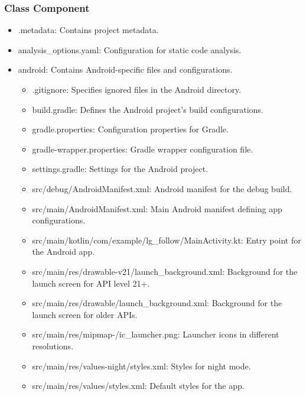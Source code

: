 \documentclass[conference]{IEEEtran}
\begin{document}
\subsubsection{Class Component}
\begin{itemize}
    \item .metadata: Contains project metadata. \\
    \item analysis\_options.yaml: Configuration for static code analysis. \\

    \item android: Contains Android-specific files and configurations.
    \begin{itemize}
        \item .gitignore: Specifies ignored files in the Android directory. \\
        \item build.gradle: Defines the Android project’s build configurations. \\
        \item gradle.properties: Configuration properties for Gradle. \\
        \item gradle-wrapper.properties: Gradle wrapper configuration file. \\
        \item settings.gradle: Settings for the Android project. \\
        \item src/debug/AndroidManifest.xml: Android manifest for the debug build. \\
        \item src/main/AndroidManifest.xml: Main Android manifest defining app configurations. \\
        \item src/main/kotlin/com/example/lg\_follow/MainActivity.kt: Entry point for the Android app. \\
        \item src/main/res/drawable-v21/launch\_background.xml: Background for the launch screen for API level 21+. \\
        \item src/main/res/drawable/launch\_background.xml: Background for the launch screen for older APIs. \\
        \item src/main/res/mipmap-\*/ic\_launcher.png: Launcher icons in different resolutions. \\
        \item src/main/res/values-night/styles.xml: Styles for night mode. \\
        \item src/main/res/values/styles.xml: Default styles for the app. \\
    \end{itemize}


\end{itemize}
\end{document}

